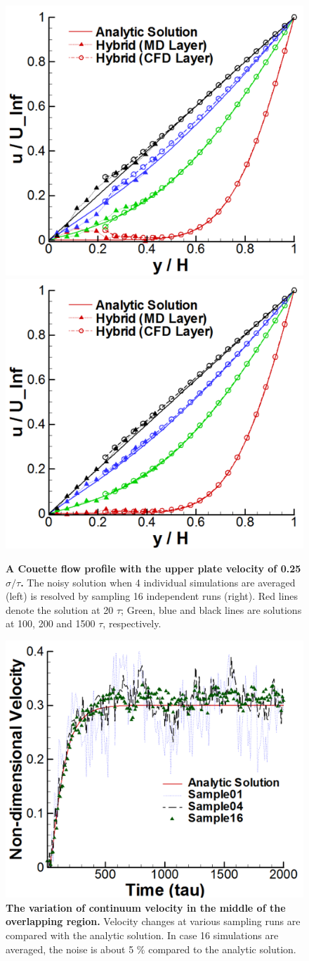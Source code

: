 \documentclass[preprint,12pt]{elsarticle}
\begin{document}
\begin{figure}
\centering
\includegraphics[width=0.6\linewidth]{Couette_025_Samp4.pdf}
\hskip 1cm
\includegraphics[width=0.6\linewidth]{Couette_025_Samp16.pdf}
\vskip-0.2cm
\caption{\small {\bf A Couette flow profile with the upper plate velocity of 0.25 $\sigma/\tau$.} The noisy solution when 4 individual simulations are averaged (left) is resolved by sampling 16 independent runs (right). Red lines denote the solution at 20 $\tau$; Green, blue and black lines are solutions at 100, 200 and 1500 $\tau$, respectively.}
\label{multiple_couette}
\end{figure}

\begin{figure}
\centering
\includegraphics[width=0.6\linewidth]{Couette_025_Temporal_Multiset.pdf}
\vskip-0.2cm
\caption{\small {\bf The variation of continuum velocity in the middle of the overlapping region.} Velocity changes at various sampling runs are compared with the analytic solution. In case 16 simulations are averaged, the noise is about 5 $\%$ compared to the analytic solution.}
\label{multiple_couette_temporal}
\end{figure}
\end{document}

